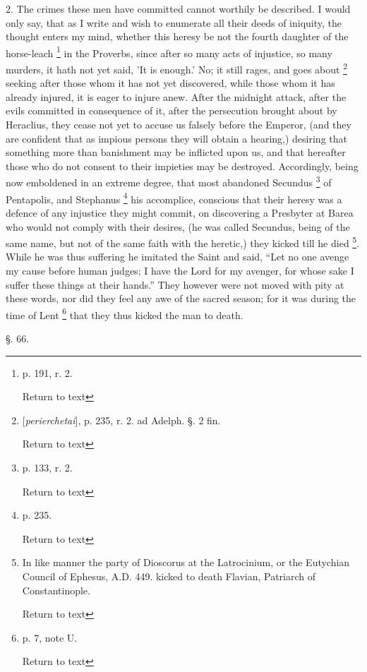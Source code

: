2. The crimes these men have committed cannot
worthily be described. I would only say, that as I write and wish to
enumerate all their deeds of iniquity, the thought enters my mind,
whether this heresy be not the fourth daughter of the horse-leach \footnote{p. 191, r. 2.

Return to text} in the Proverbs, since after so many acts of injustice, so
many murders, it hath not yet said, 'It is enough.' No; it still
rages, and goes about \footnote{[\emph{perierchetai}], p. 235, r. 2. ad Adelph.
§. 2 fin.

Return to text} seeking after those whom it has not yet
discovered, while those whom it has already injured, it is eager to
injure anew. After the midnight attack, after the evils committed in
consequence of it, after the persecution brought about by Heraclius,
they cease not yet to accuse us falsely before the Emperor, (and they
are confident that as impious persons they will obtain a hearing,)
desiring that something more than banishment may be inflicted upon us,
and that hereafter those who do not consent to their impieties may be
destroyed. Accordingly, being now emboldened in an extreme degree,
that most abandoned Secundus \footnote{p. 133, r. 2.

Return to text} of Pentapolis, and Stephanus
\footnote{p. 235.

Return to text} his accomplice, conscious that their heresy was a defence of
any injustice they might commit, on discovering a Presbyter at Barea
who would not comply with their desires, (he was called Secundus,
being of the same name, but not of the same faith with the heretic,)
they kicked till he died \footnote{In like manner the party of Dioscorus at the
Latrocinium, or the Eutychian Council of Ephesus, A.D. 449. kicked to
death Flavian, Patriarch of Constantinople.

Return to text}. While he was thus suffering he
imitated the Saint and said, ``Let no one avenge my cause before human
judges; I have the Lord for my avenger, for whose sake I suffer these
things at their hands.'' They however were not moved with pity at these
words, nor did they feel any awe of the sacred season; for it was
during the time of Lent \footnote{p. 7, note U.

Return to text} that they thus kicked the man to
death.

§. 66.

